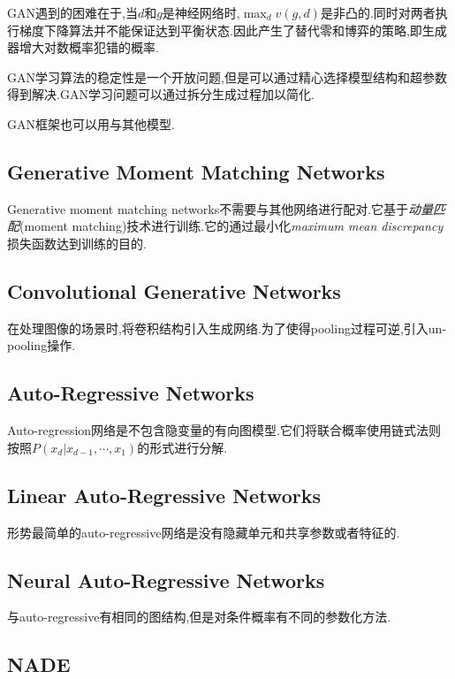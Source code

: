 GAN遇到的困难在于,当$d$和$g$是神经网络时,$\max_d v(g,d)$是非凸的.同时对两者执行梯度下降算法并不能保证达到平衡状态.因此产生了替代零和博弈的策略,即生成器增大对数概率犯错的概率.

GAN学习算法的稳定性是一个开放问题,但是可以通过精心选择模型结构和超参数得到解决.GAN学习问题可以通过拆分生成过程加以简化.

GAN框架也可以用与其他模型.

\subsection{Generative Moment Matching Networks}

Generative moment matching networks不需要与其他网络进行配对.它基于\textit{动量匹配}(moment matching)技术进行训练.它的通过最小化\textit{maximum mean discrepancy}损失函数达到训练的目的.

\subsection{Convolutional Generative Networks}

在处理图像的场景时,将卷积结构引入生成网络.为了使得pooling过程可逆,引入un-pooling操作.

\subsection{Auto-Regressive Networks}

Auto-regression网络是不包含隐变量的有向图模型.它们将联合概率使用链式法则按照$P(x_d|x_{d-1},\cdots,x_1)$的形式进行分解.

\subsection{Linear Auto-Regressive Networks}

形势最简单的auto-regressive网络是没有隐藏单元和共享参数或者特征的.

\subsection{Neural Auto-Regressive Networks}

与auto-regressive有相同的图结构,但是对条件概率有不同的参数化方法.

\subsection{NADE}

